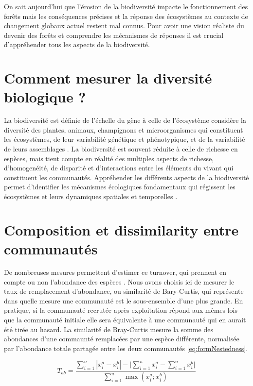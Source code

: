 \documentclass[
  11pt,
  french,
  A4paper,
  extrafontsizes,onecolumn,openright
  ]{memoir}
\begin{document}
On sait aujourd'hui que l'érosion de la biodiversité impacte le
fonctionnement des forêts mais les conséquences précises et la réponse
des écosystèmes au contexte de changement globaux actuel restent mal
connus. Pour avoir une vision réaliste du devenir des forêts et
comprendre les mécanismes de réponses il est crucial d'appréhender tous
les aspects de la biodiversité.

\section{Comment mesurer la diversité biologique
?}\label{comment-mesurer-la-diversite-biologique}

La biodiversité est définie de l'échelle du gène à celle de l'écosystème
considère la diversité des plantes, animaux, champignons et
microorganismes qui constituent les écosystèmes, de leur variabilité
génétique et phénotypique, et de la variabilité de leurs assemblages
\autocite{Loreau2005}. La biodiversité est souvent réduite à celle de
richesse en espèces, mais tient compte en réalité des multiples aspects
de richesse, d'homogenéité, de disparité et d'interactions entre les
éléments du vivant qui constituent les communautés. Appréhender les
différents aspects de la biodiversité permet d'identifier les mécanismes
écologiques fondamentaux qui régissent les écosystèmes et leurs
dynamiques spatiales et temporelles \autocites{Purvis2000}{Loreau2005}.

\section{Composition et dissimilarity entre
communautés}\label{composition-et-dissimilarity-entre-communautes}

De nombreuses mesures permettent d'estimer ce turnover, qui prennent en
compte ou non l'abondance des espèces \autocite{Podani2013a}. Nous avons
choisis ici de mesurer le taux de remplacement d'abondance, ou
similarité de Bary-Curtis, qui représente dans quelle mesure une
communauté est le sous-ensemble d'une plus grande. En pratique, si la
communauté recrutée après exploitation répond aux mêmes lois que la
communauté initiale elle sera équivalente à une communauté qui en aurait
été tirée au hasard. La similarité de Bray-Curtis mesure la somme des
abondances d'une commaunté remplacées par une espèce différente,
normalisée par l'abondance totale partagée entre les deux communautés
\eqref{eq:formNestedness}.

\begin{equation}
T_{ab}=\frac{\sum_{i=1}^{n}|x_i^a - x_i^b| - \bigg| \sum_{i=1}^{n}{x_i^a} - \sum_{i=1}^{n}{x_i^b} \bigg|}{\sum_{i=1}^{n}\max{\left( x_i^a;x_i^b \right)}}
\label{eq:formNestedness}
\end{equation}
\end{document}

